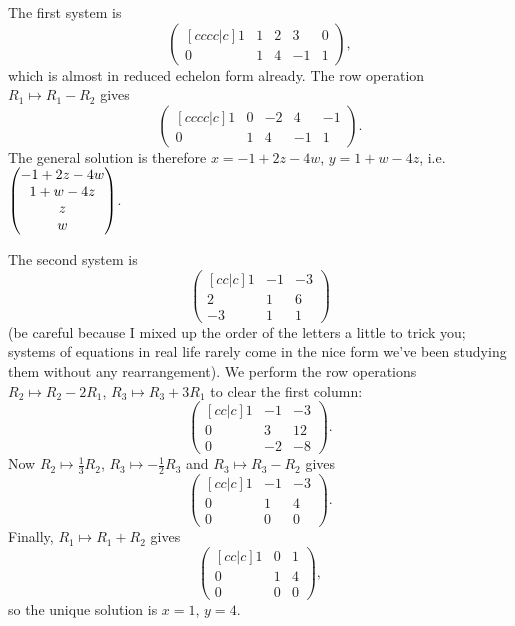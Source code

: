 \documentclass{article}
\begin{document}
\begin{Solution}
The first system is \[\begin{pmatrix}[cccc|c] 1 & 1 & 2 & 3 & 0 \\ 0
& 1 & 4 & -1 & 1\end{pmatrix},\] which is almost in reduced echelon
form already. The row operation \(R_1\mapsto R_1-R_2\) gives
\[\begin{pmatrix}[cccc|c] 1 & 0 & -2 & 4 & -1 \\ 0 & 1 & 4 & -1 &
1\end{pmatrix}.\] The general solution is therefore \(x=-1+2z-4w\),
\(y=1+w-4z\), i.e. \(\begin{pmatrix} -1+2z-4w \\ 1+w-4z \\ z \\ w\end{pmatrix}\).


The second system is \[\begin{pmatrix}[cc|c] 1 & -1 & -3 \\ 2 & 1 &
6 \\ -3 & 1 & 1\end{pmatrix}\] (be careful because I mixed up the
order of the letters a little to trick you; systems of equations in
real life rarely come in the nice form we've been studying them
without any rearrangement). We perform the row operations
\(R_2\mapsto R_2-2R_1\), \(R_3\mapsto R_3+3R_1\) to clear the first
column: \[\begin{pmatrix}[cc|c] 1 & -1 & -3 \\ 0 & 3 & 12 \\ 0 & -2
& -8\end{pmatrix}.\] Now \(R_2\mapsto\frac{1}{3}R_2\),
\(R_3\mapsto-\frac{1}{2}R_3\) and \(R_3\mapsto R_3-R_2\) gives
\[\begin{pmatrix}[cc|c] 1 & -1 & -3 \\ 0 & 1 & 4 \\ 0 & 0 &
0\end{pmatrix}.\] Finally, \(R_1\mapsto R_1+R_2\) gives
\[\begin{pmatrix}[cc|c] 1 & 0 & 1 \\ 0 & 1 & 4 \\ 0 & 0 &
0\end{pmatrix},\] so the unique solution is \(x=1\), \(y=4\).



\end{Solution}
\end{document}
